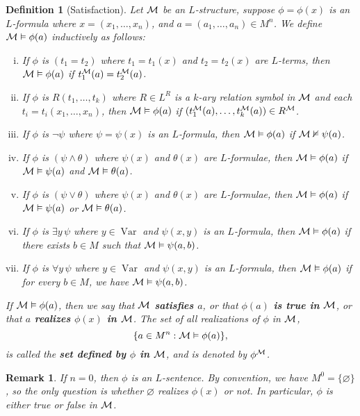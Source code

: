 \documentclass[10pt]{article}
\DeclareMathOperator{\Var}{Var}
\theoremstyle{newstyle}
\newtheorem{remark}[thm]{Remark}
\newtheorem{defn}[thm]{Definition}
\begin{document}
\begin{defn}[Satisfaction] 
Let ${\cal M}$ be an $L$-structure, suppose $\phi = \phi(x)$ is an $L$-formula where 
$x = (x_1, \dots, x_n)$, and $a = (a_1, \dots, a_n) \in M^n$. We define ${\cal M} 
\vDash \phi(a)$ inductively as follows:
\begin{enumerate}[(i)]
    \item If $\phi$ is $(t_1 = t_2)$ where $t_1 = t_1(x)$ and $t_2 = t_2(x)$ are $L$-terms, then 
    ${\cal M} \vDash \phi(a)$ if $t_1^{\cal M}(a) = t_2^{\cal M}(a)$.
    \item If $\phi$ is $R(t_1, \dots, t_k)$ where $R \in L^R$ is a $k$-ary relation symbol 
    in ${\cal M}$ and each $t_i = t_i(x_1, \dots, x_n)$, then ${\cal M} \vDash 
    \phi(a)$ if $(t_1^{\cal M}(a), \dots, t_k^{\cal M}(a)) \in R^{\cal M}$.
    \item If $\phi$ is $\neg \psi$ where $\psi = \psi(x)$ is an $L$-formula, then 
    ${\cal M} \vDash \phi(a)$ if ${\cal M} \nvDash \psi(a)$. 
    \item If $\phi$ is $(\psi \wedge \theta)$ where $\psi(x)$ and $\theta(x)$ 
    are $L$-formulae, then ${\cal M} \vDash \phi(a)$ if ${\cal M} \vDash \psi(a)$ and 
    ${\cal M} \vDash \theta(a)$.
    \item If $\phi$ is $(\psi \vee \theta)$ where $\psi(x)$ and $\theta(x)$ 
    are $L$-formulae, then ${\cal M} \vDash \phi(a)$ if ${\cal M} \vDash \psi(a)$ or
    ${\cal M} \vDash \theta(a)$.
    \item If $\phi$ is $\exists y \, \psi$ where $y \in \Var$ and $\psi(x, y)$ is an 
    $L$-formula, then ${\cal M} \vDash \phi(a)$ if there exists $b \in M$ such that 
    ${\cal M} \vDash \psi(a, b)$.
    \item If $\phi$ is $\forall y \, \psi$ where $y \in \Var$ and $\psi(x, y)$ is an 
    $L$-formula, then ${\cal M} \vDash \phi(a)$ if for every $b \in M$, we have 
    ${\cal M} \vDash \psi(a, b)$.
\end{enumerate}
If ${\cal M} \vDash \phi(a)$, then we say that {\bf ${\cal M}$ satisfies $a$}, or that
{\bf $\phi(a)$ is true in ${\cal M}$}, or that {\bf $a$ realizes $\phi(x)$ in ${\cal M}$}. 
The set of all realizations of $\phi$ in ${\cal M}$, 
\[ \{a \in M^n : {\cal M} \vDash \phi(a)\}, \] 
is called the {\bf set defined by $\phi$ in ${\cal M}$}, and is denoted by $\phi^{\cal M}$.
\end{defn}

\begin{remark}
If $n = 0$, then $\phi$ is an $L$-sentence. By convention, we have $M^0 = \{\varnothing\}$, so 
the only question is whether $\varnothing$ realizes $\phi(x)$ or not. In particular, 
$\phi$ is either true or false in ${\cal M}$.
\end{remark}
\end{document}
